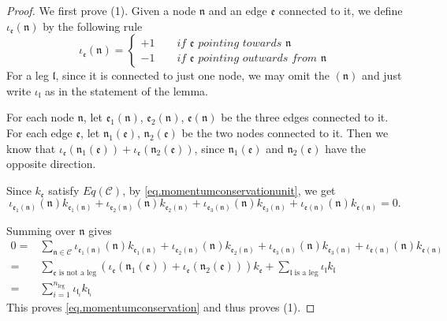 \begin{proof}
We first prove (1). Given a node $\mathfrak{n}$ and an edge $\mathfrak{e}$ connected to it, we define $\iota_{\mathfrak{e}}(\mathfrak{n})$ by the following rule
\begin{equation}
\iota_{\mathfrak{e}}(\mathfrak{n})=\begin{cases}
    +1 \qquad \textit{if $\mathfrak{e}$ pointing towards $\mathfrak{n}$}
    \\
    -1 \qquad  \textit{if $\mathfrak{e}$ pointing outwards from $\mathfrak{n}$}
\end{cases}
\end{equation}
For a leg $\mathfrak{l}$, since it is connected to just one node, we may omit the $(\mathfrak{n})$ and just write $\iota_{\mathfrak{l}}$ as in the statement of the lemma.

For each node $\mathfrak{n}$, let $\mathfrak{e}_1(\mathfrak{n})$, $\mathfrak{e}_2(\mathfrak{n})$, $\mathfrak{e}(\mathfrak{n})$ be the three edges connected to it. For each edge $\mathfrak{e}$, let $\mathfrak{n}_1(\mathfrak{e})$, $\mathfrak{n}_2(\mathfrak{e})$ be the two nodes connected to it. Then we know that $\iota_{\mathfrak{e}}(\mathfrak{n}_1(\mathfrak{e}))+\iota_{\mathfrak{e}}(\mathfrak{n}_2(\mathfrak{e}))$, since $\mathfrak{n}_1(\mathfrak{e})$ and $\mathfrak{n}_2(\mathfrak{e})$ have the opposite direction. 

Since $k_{\mathfrak{e}}$ satisfy $Eq(\mathcal{C})$, by \eqref{eq.momentumconservationunit}, we get 
\begin{equation}
    \iota_{\mathfrak{e}_1(\mathfrak{n})}(\mathfrak{n})k_{\mathfrak{e}_1(\mathfrak{n})}+\iota_{\mathfrak{e}_2(\mathfrak{n})}(\mathfrak{n})k_{\mathfrak{e}_2(\mathfrak{n})}+\iota_{\mathfrak{e}_3(\mathfrak{n})}(\mathfrak{n})k_{\mathfrak{e}_3(\mathfrak{n})}+\iota_{\mathfrak{e}(\mathfrak{n})}(\mathfrak{n})k_{\mathfrak{e}(\mathfrak{n})}=0.
\end{equation}

Summing over $\mathfrak{n}$ gives 
\begin{equation}
\begin{split}
    0=&\sum_{\mathfrak{n}\in \mathcal{C}}\iota_{\mathfrak{e}_1(\mathfrak{n})}(\mathfrak{n})k_{\mathfrak{e}_1(\mathfrak{n})}+\iota_{\mathfrak{e}_2(\mathfrak{n})}(\mathfrak{n})k_{\mathfrak{e}_2(\mathfrak{n})}+\iota_{\mathfrak{e}_3(\mathfrak{n})}(\mathfrak{n})k_{\mathfrak{e}_3(\mathfrak{n})}+\iota_{\mathfrak{e}(\mathfrak{n})}(\mathfrak{n})k_{\mathfrak{e}(\mathfrak{n})}
    \\
    =& \sum_{\mathfrak{e}\text{ is not a leg}} 
    (\iota_{\mathfrak{e}}(\mathfrak{n}_1(\mathfrak{e}))+\iota_{\mathfrak{e}}(\mathfrak{n}_2(\mathfrak{e}))) k_{\mathfrak{e}}+ \sum_{\mathfrak{l}\text{ is a leg}} 
    \iota_{\mathfrak{l}} k_{\mathfrak{l}}
    \\
    =& \sum_{i=1}^{n_{\text{leg}}} \iota_{\mathfrak{l}_i}k_{\mathfrak{l}_i}
\end{split}
\end{equation}
This proves \eqref{eq.momentumconservation} and thus proves (1).


\end{proof}
